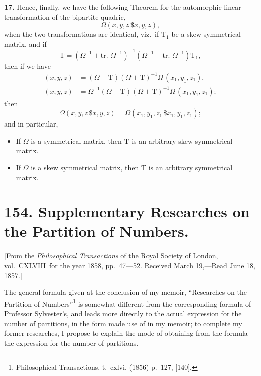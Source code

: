 \documentclass[12pt,a4paper]{article}
\theoremstyle{definition}
\begin{document}
\medskip
\noindent\textbf{17.} Hence, finally, we have the following Theorem for the automorphic linear transformation of the bipartite quadric,
\[
\Omega(x,y,z\,\$x,y,z),
\]
when the two transformations are identical, viz.\ if $\mathrm{T}_1$ be a skew symmetrical matrix, and if
\[
\mathrm{T} = (\Omega^{-1} + \text{tr. }\Omega^{-1})^{-1}(\Omega^{-1} - \text{tr. }\Omega^{-1})\mathrm{T}_1,
\]
then if we have
\begin{align*}
(x,y,z) &= (\Omega - \mathrm{T})(\Omega + \mathrm{T})^{-1}\Omega\,(x_1,y_1,z_1), \\
(x,y,z) &= \Omega^{-1}(\Omega - \mathrm{T})(\Omega + \mathrm{T})^{-1}\Omega\,(x_1,y_1,z_1);
\end{align*}
then
\[\Omega(x,y,z\,\$x,y,z) = \Omega(x_1,y_1,z_1\,\$x_1,y_1,z_1);\]
and in particular,
\begin{itemize}[leftmargin=2em]
\item If $\Omega$ is a symmetrical matrix, then $\mathrm{T}$ is an arbitrary skew symmetrical matrix.
\item If $\Omega$ is a skew symmetrical matrix, then $\mathrm{T}$ is an arbitrary symmetrical matrix.
\end{itemize}

\newpage

\section*{154. Supplementary Researches on the Partition of Numbers.}

[From the \textit{Philosophical Transactions} of the Royal Society of London, vol.~CXLVIII\ for the year 1858, pp.~47---52.
Received March 19,---Read June 18, 1857.]

\bigskip

The general formula given at the conclusion of my memoir, ``Researches on the Partition of Numbers''\footnote{Philosophical Transactions, t.~cxlvi. (1856) p.~127, [140].} is somewhat different from the corresponding formula of Professor Sylvester's, and leads more directly to the actual expression for the number of partitions, in the form made use of in my memoir; to complete my former researches, I propose to explain the mode of obtaining from the formula the expression for the number of partitions.
\end{document}
